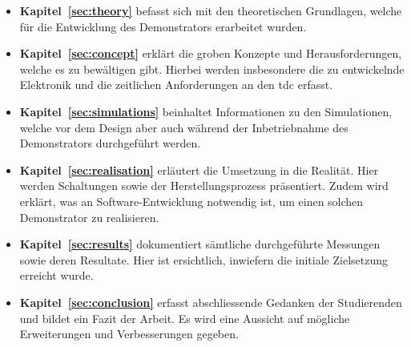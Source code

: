 \begin{itemize}
    \item \textbf{Kapitel~\ref{sec:theory}} befasst sich mit den theoretischen Grundlagen, welche für die Entwicklung des
          Demonstrators erarbeitet wurden.

    \item \textbf{Kapitel~\ref{sec:concept}} erklärt die groben Konzepte und Herausforderungen, welche es zu bewältigen gibt.
          Hierbei werden insbesondere die zu entwickelnde Elektronik und die zeitlichen Anforderungen an den \acrshort{tdc} erfasst.

    \item \textbf{Kapitel~\ref{sec:simulations}} beinhaltet Informationen zu den Simulationen, welche vor dem Design
           aber auch während der Inbetriebnahme des Demonstrators durchgeführt werden.

    \item \textbf{Kapitel~\ref{sec:realisation}} erläutert die Umsetzung in die Realität. Hier werden Schaltungen sowie
          der Herstellungsprozess präsentiert. Zudem wird erklärt, was an Software-Entwicklung notwendig ist, um einen
          solchen Demonstrator zu realisieren.

    \item \textbf{Kapitel~\ref{sec:results}} dokumentiert sämtliche durchgeführte Messungen sowie deren Resultate.
          Hier ist ersichtlich, inwiefern die initiale Zielsetzung erreicht wurde.

    \item \textbf{Kapitel~\ref{sec:conclusion}} erfasst abschliessende Gedanken der Studierenden und bildet ein Fazit der Arbeit.
          Es wird eine Aussicht auf mögliche Erweiterungen und Verbesserungen gegeben.
\end{itemize}
